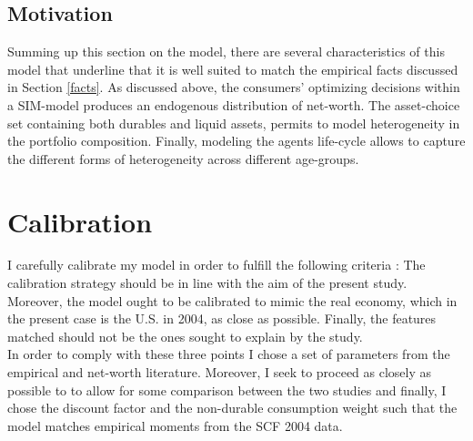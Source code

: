 \documentclass[a4paper,12pt,legno]{article}
\begin{document}
\subsection{Motivation}
Summing up this section on the model, there are several characteristics of this model that underline that it is well suited to match the empirical facts discussed in Section \ref{facts}. As discussed above, the consumers' optimizing decisions within a SIM-model produces an endogenous distribution of net-worth. The asset-choice set containing both durables and liquid assets, permits to model heterogeneity in the portfolio composition. Finally, modeling the agents life-cycle allows to capture the different forms of heterogeneity across different age-groups. 

\section{Calibration}
I carefully calibrate my model in order to fulfill the following criteria \citep{kydland1996computational}: The calibration strategy should be in line with the aim of the present study. Moreover, the model ought to be calibrated to mimic the real economy, which in the present case is the U.S. in 2004, as close as possible. Finally, the features matched should not be the ones sought to explain by the study. \\
In order to comply with these three points I chose a set of parameters from the empirical and net-worth literature. Moreover, I seek to proceed as closely as possible to \cite{hintermaier2011} to allow for some comparison between the two studies and finally, I chose the discount factor and the non-durable consumption weight such that the model matches empirical moments from the SCF 2004 data. 
\end{document}
